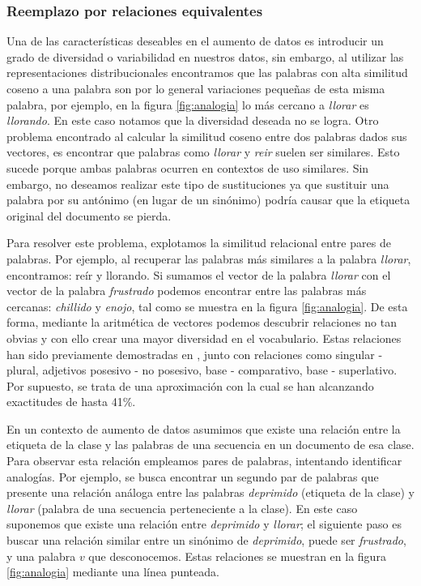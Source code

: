 


\subsubsection{Reemplazo por relaciones equivalentes}
Una de las características deseables en el aumento de datos es introducir un grado de diversidad o variabilidad en nuestros datos, sin embargo, al utilizar las representaciones distribucionales encontramos que las palabras con alta similitud coseno a una palabra son por lo general variaciones pequeñas de esta misma palabra, por ejemplo, en la figura \ref{fig:analogia} lo más cercano a \textit{llorar} es \textit{llorando}. En este caso notamos que la diversidad deseada no se logra. 
Otro problema encontrado al calcular la similitud coseno entre dos palabras dados sus vectores, es encontrar que palabras como \textit{llorar} y \textit{reir} suelen ser similares. Esto sucede porque ambas palabras ocurren en contextos de uso similares. Sin embargo, no deseamos realizar este tipo de sustituciones ya que sustituir una palabra por su antónimo (en lugar de un sinónimo) podría causar que la etiqueta original del documento se pierda.


Para resolver este problema, explotamos la similitud relacional entre pares de palabras. Por ejemplo, al recuperar las palabras más similares a la palabra \textit{llorar}, encontramos: reír y llorando. Si sumamos el vector de la palabra \textit{llorar} con el vector de la palabra \textit{frustrado} podemos encontrar entre las palabras más cercanas: \textit{chillido} y \textit{enojo}, tal como se muestra en la figura \ref{fig:analogia}. De esta forma, mediante la aritmética de vectores podemos descubrir relaciones no tan obvias y con ello crear una mayor diversidad en el vocabulario. Estas relaciones han sido previamente demostradas en \citep{mikolov2013linguistic}, junto con relaciones como singular - plural, adjetivos posesivo - no posesivo, base - comparativo, base - superlativo. Por  supuesto, se trata de una aproximación con la cual se han alcanzando exactitudes de hasta 41\%. 

En un contexto de aumento de datos asumimos que existe una relación entre la etiqueta de la clase y las palabras de una secuencia en un documento de esa clase. Para observar esta relación empleamos pares de palabras, intentando identificar analogías. Por ejemplo, se busca encontrar un segundo par de palabras que presente una relación análoga entre las palabras \textit{deprimido} (etiqueta de la clase) y \textit{llorar} (palabra de una secuencia perteneciente a la clase). En este caso suponemos que existe una relación entre \textit{deprimido} y \textit{llorar}; el siguiente paso es buscar una relación similar entre un sinónimo de \textit{deprimido}, puede ser \textit{frustrado}, y una palabra $v$ que desconocemos. Estas relaciones se muestran en la figura \ref{fig:analogia} mediante una línea punteada. 

